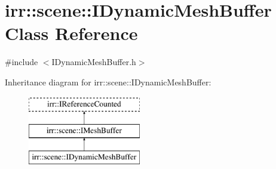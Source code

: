 \hypertarget{classirr_1_1scene_1_1IDynamicMeshBuffer}{}\section{irr\+:\+:scene\+:\+:I\+Dynamic\+Mesh\+Buffer Class Reference}
\label{classirr_1_1scene_1_1IDynamicMeshBuffer}


{\ttfamily \#include $<$I\+Dynamic\+Mesh\+Buffer.\+h$>$}

Inheritance diagram for irr\+:\+:scene\+:\+:I\+Dynamic\+Mesh\+Buffer\+:\begin{figure}[H]
\begin{center}
\leavevmode
\includegraphics[height=3.000000cm]{classirr_1_1scene_1_1IDynamicMeshBuffer}
\end{center}
\end{figure}
